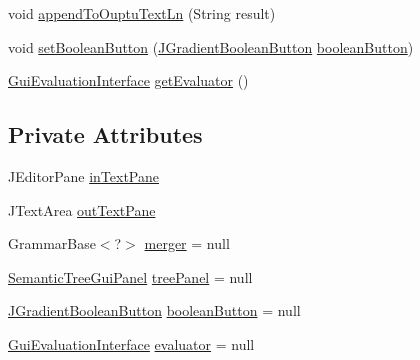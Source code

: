 \begin{DoxyCompactItemize}
\item 
void \hyperlink{classit_1_1emarolab_1_1cagg_1_1debugging_1_1baseComponents_1_1customPanel_1_1TestDebugginGuiPanel_af96b0b79d88558f85177878cedc198fd}{append\-To\-Ouptu\-Text\-Ln} (String result)
\item 
void \hyperlink{classit_1_1emarolab_1_1cagg_1_1debugging_1_1baseComponents_1_1customPanel_1_1TestDebugginGuiPanel_acc6af800faa3c30f08224d96fd48c68f}{set\-Boolean\-Button} (\hyperlink{classit_1_1emarolab_1_1cagg_1_1debugging_1_1baseComponents_1_1JGradientBooleanButton}{J\-Gradient\-Boolean\-Button} \hyperlink{classit_1_1emarolab_1_1cagg_1_1debugging_1_1baseComponents_1_1customPanel_1_1TestDebugginGuiPanel_afbafc7cedbeed8a0301c50f4a0601dad}{boolean\-Button})
\item 
\hyperlink{interfaceit_1_1emarolab_1_1cagg_1_1core_1_1evaluation_1_1interfacing_1_1GuiEvaluationInterface}{Gui\-Evaluation\-Interface} \hyperlink{classit_1_1emarolab_1_1cagg_1_1debugging_1_1baseComponents_1_1customPanel_1_1TestDebugginGuiPanel_ac1a9341c7f4ecde0210da6dac2431c1f}{get\-Evaluator} ()
\end{DoxyCompactItemize}
\subsection*{Private Attributes}
\begin{DoxyCompactItemize}
\item 
J\-Editor\-Pane \hyperlink{classit_1_1emarolab_1_1cagg_1_1debugging_1_1baseComponents_1_1customPanel_1_1TestDebugginGuiPanel_a97f617552f2ead5e46269b5b8ee6e6ef}{in\-Text\-Pane}
\item 
J\-Text\-Area \hyperlink{classit_1_1emarolab_1_1cagg_1_1debugging_1_1baseComponents_1_1customPanel_1_1TestDebugginGuiPanel_a34bd5791b202b681798d7f3928550ec5}{out\-Text\-Pane}
\item 
Grammar\-Base$<$?$>$ \hyperlink{classit_1_1emarolab_1_1cagg_1_1debugging_1_1baseComponents_1_1customPanel_1_1TestDebugginGuiPanel_a59be25211fda834109470e630af66346}{merger} = null
\item 
\hyperlink{classit_1_1emarolab_1_1cagg_1_1debugging_1_1baseComponents_1_1customPanel_1_1SemanticTreeGuiPanel}{Semantic\-Tree\-Gui\-Panel} \hyperlink{classit_1_1emarolab_1_1cagg_1_1debugging_1_1baseComponents_1_1customPanel_1_1TestDebugginGuiPanel_aa6da15d3e740440a5825086412761edd}{tree\-Panel} = null
\item 
\hyperlink{classit_1_1emarolab_1_1cagg_1_1debugging_1_1baseComponents_1_1JGradientBooleanButton}{J\-Gradient\-Boolean\-Button} \hyperlink{classit_1_1emarolab_1_1cagg_1_1debugging_1_1baseComponents_1_1customPanel_1_1TestDebugginGuiPanel_afbafc7cedbeed8a0301c50f4a0601dad}{boolean\-Button} = null
\item 
\hyperlink{interfaceit_1_1emarolab_1_1cagg_1_1core_1_1evaluation_1_1interfacing_1_1GuiEvaluationInterface}{Gui\-Evaluation\-Interface} \hyperlink{classit_1_1emarolab_1_1cagg_1_1debugging_1_1baseComponents_1_1customPanel_1_1TestDebugginGuiPanel_a9ea0e4a2559448ce344ac64cd54ea8a7}{evaluator} = null
\end{DoxyCompactItemize}
